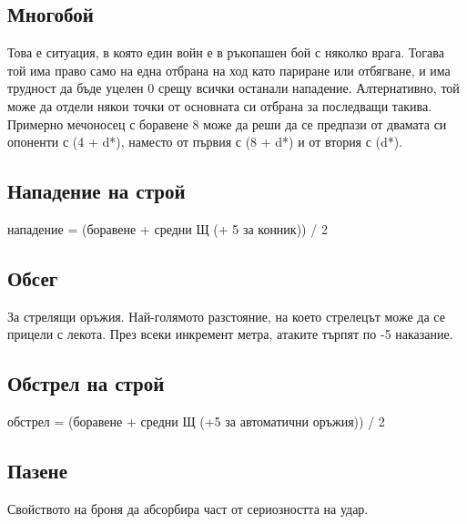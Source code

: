 \begin{footnotesize}
\subsection{Многобой}
Това е ситуация, в която един войн е в ръкопашен бой с няколко врага.
Тогава той има право само на една отбрана на ход като париране или отбягване, и има трудност да бъде уцелен 0 срещу всички останали нападение.
Алтернативно, той може да отдели някои точки от основната си отбрана за последващи такива.
Примерно мечоносец с боравене 8 може да реши да се предпази от двамата си опоненти с (4 + d*), наместо от първия с (8 + d*) и от втория с (d*).


\subsection{Нападение на строй}
нападение = (боравене + средни Щ (+ 5 за конник)) / 2


\subsection{Обсег}
За стрелящи оръжия.
Най-голямото разстояние, на което стрелецът може да се прицели с лекота.
През всеки инкремент метра, атаките търпят по -5 наказание.


\subsection{Обстрел на строй}
обстрел = (боравене + средни Щ (+5 за автоматични оръжия)) / 2






\subsection{Пазене}
Свойството на броня да абсорбира част от сериозността на удар.



\end{footnotesize}
